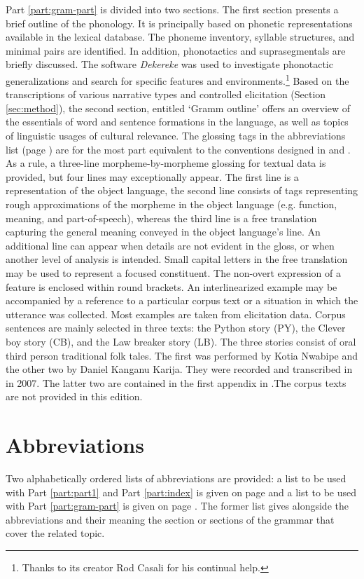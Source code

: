 Part \ref{part:gram-part} is divided into two sections.
The first section presents a brief outline of the phonology. It 
is principally based on phonetic representations available in the lexical database.   
The phoneme inventory,  syllable structures, and minimal pairs are identified. In 
addition, phonotactics and suprasegmentals are briefly discussed. The software 
{\it Dekereke} was used to investigate phonotactic generalizations and search 
for specific features and environments.\footnote{Thanks to its creator Rod 
Casali for his continual help.}  Based on the transcriptions of various 
narrative types and controlled elicitation (Section \ref{sec:method}), the second section, entitled `Gramm outline'   offers an overview of  the essentials of word and sentence 
formations in the language, as well as topics of linguistic usages of cultural 
relevance. The glossing tags in the abbreviations list (page \pageref{sec-ABB}) are for the most part 
equivalent to the conventions designed in  \citet{Comr08b} and \citet{hasp14}.  
As a rule,   a three-line morpheme-by-morpheme  glossing for textual data is 
provided, but  four lines may exceptionally appear.  The first line is a 
representation of the object language, the second line consists of   tags 
representing  rough approximations  of the morpheme in the object   language 
(e.g. function, meaning,  and part-of-speech), whereas the third line is a free  
translation capturing the general meaning  conveyed in the object language's 
line. An additional line can appear when details are not evident in the gloss, 
or when another level of analysis is intended.  Small capital letters in 
the  free translation may be used to represent a focused constituent.  The  non-overt 
expression of a feature is enclosed within round brackets. An interlinearized example  may  be accompanied by a 
reference  to a particular corpus text or  a situation in which the utterance 
was collected. Most  examples are taken from elicitation data. Corpus sentences are mainly selected in three texts: the Python story (PY), the Clever boy story (CB), and the Law breaker story (LB). The three stories consist of oral third person traditional folk tales. 
 The first was performed by Kotia Nwabipe  and the other two by Daniel Kanganu Karija.  They were recorded and transcribed in  in 2007. The latter two are contained in the first appendix in \citet[471-500]{brin11}.The corpus texts are not provided in this edition. 



\section{Abbreviations}
\label{LEX:abbrev}


 Two alphabetically ordered lists of abbreviations are provided: a list to be used with Part \ref{part:part1} and Part  \ref{part:index} is given on page \pageref{sec-AB} and a list to be used with Part \ref{part:gram-part} is given on page \pageref{sec-ABB}. The former  list gives alongside the abbreviations and their meaning the section or sections of the 
grammar that cover the related topic. 